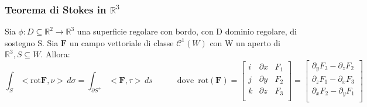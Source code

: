 \documentclass{article} %
\begin{document}
    \subsubsection*{Teorema di Stokes in $\mathbb{R}^3$}
    Sia $\phi:D \subseteq \mathbb{R}^2 \to \mathbb{R}^3$ una superficie regolare con bordo, con D dominio regolare, di sostegno S. Sia $\mathbf{F}$ un campo vettoriale di classe $\mathcal{C}^1(W)$ con W un aperto di $\mathbb{R}^3, S \subseteq W$. Allora:
    $$\int_S < \text{rot} \mathbf{F}, \nu> \, d \sigma = \int_{\partial S^+} < \mathbf{F} , \tau > \, ds \,\,\,\,\,\,\,\,\,\,\,\,\,\,\,\,\,\, \text{dove} \,\,\, \text{rot}(\mathbf{F}) = \begin{bmatrix}
        i & \partial x & F_1\\
        j & \partial y & F_2 \\
        k & \partial z & F_3 \\
    \end{bmatrix}
    =\begin{bmatrix}
        \partial_y F_3 - \partial_z F_2\\
        \partial_z F_1 - \partial_x F_3 \\
        \partial_x F_2 - \partial_y F_1 \\
    \end{bmatrix}$$
\end{document}
